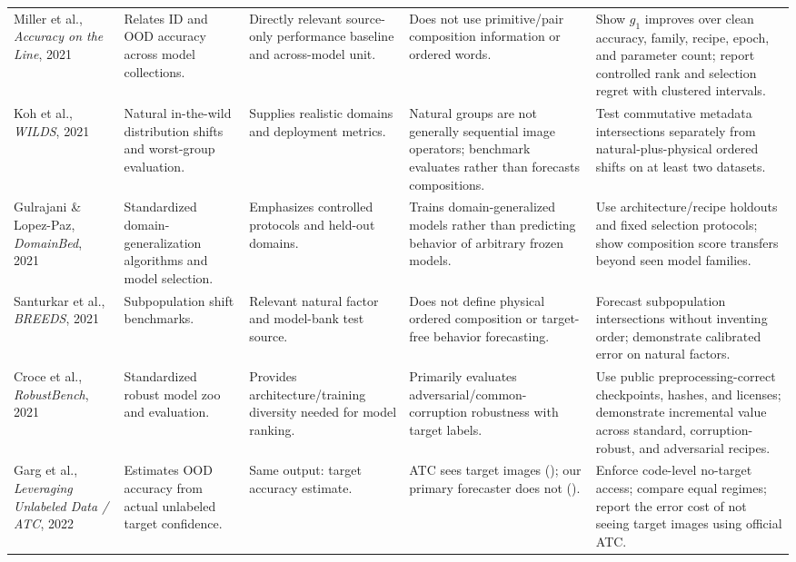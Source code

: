 \documentclass[11pt,a4paper]{article}
\newcommand{\Rtwo}{\mathrm{R2}}
\newcommand{\Rthree}{\mathrm{R3}}
\begin{document}
\begin{landscape}
\begin{longtable}{P{3.1cm}P{3.4cm}P{4.4cm}P{4.4cm}P{5.0cm}}
Miller et al., \emph{Accuracy on the Line}, 2021 \cite{miller2021}
& Relates ID and OOD accuracy across model collections.
& Directly relevant source-only performance baseline and across-model unit.
& Does not use primitive/pair composition information or ordered words.
& Show $g_1$ improves over clean accuracy, family, recipe, epoch, and parameter count; report controlled rank and selection regret with clustered intervals. \\

Koh et al., \emph{WILDS}, 2021 \cite{koh2021}
& Natural in-the-wild distribution shifts and worst-group evaluation.
& Supplies realistic domains and deployment metrics.
& Natural groups are not generally sequential image operators; benchmark evaluates rather than forecasts compositions.
& Test commutative metadata intersections separately from natural-plus-physical ordered shifts on at least two datasets. \\

Gulrajani \& Lopez-Paz, \emph{DomainBed}, 2021 \cite{gulrajani2021}
& Standardized domain-generalization algorithms and model selection.
& Emphasizes controlled protocols and held-out domains.
& Trains domain-generalized models rather than predicting behavior of arbitrary frozen models.
& Use architecture/recipe holdouts and fixed selection protocols; show composition score transfers beyond seen model families. \\

Santurkar et al., \emph{BREEDS}, 2021 \cite{santurkar2021}
& Subpopulation shift benchmarks.
& Relevant natural factor and model-bank test source.
& Does not define physical ordered composition or target-free behavior forecasting.
& Forecast subpopulation intersections without inventing order; demonstrate calibrated error on natural factors. \\

Croce et al., \emph{RobustBench}, 2021 \cite{croce2021}
& Standardized robust model zoo and evaluation.
& Provides architecture/training diversity needed for model ranking.
& Primarily evaluates adversarial/common-corruption robustness with target labels.
& Use public preprocessing-correct checkpoints, hashes, and licenses; demonstrate incremental value across standard, corruption-robust, and adversarial recipes. \\

Garg et al., \emph{Leveraging Unlabeled Data / ATC}, 2022 \cite{garg2022}
& Estimates OOD accuracy from actual unlabeled target confidence.
& Same output: target accuracy estimate.
& ATC sees target images (\Rthree{}); our primary forecaster does not (\Rtwo{}).
& Enforce code-level no-target access; compare equal regimes; report the error cost of not seeing target images using official ATC. \\


\end{longtable}
\end{landscape}
\end{document}
